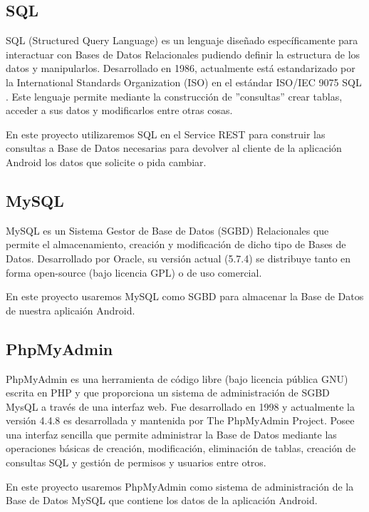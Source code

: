     \subsection{SQL}\label{ssec:sql}
    
	SQL \cite{ref:sql} (Structured Query Language) es un lenguaje diseñado específicamente para interactuar con Bases de Datos Relacionales pudiendo definir la estructura de los datos y manipularlos. Desarrollado en 1986, actualmente está estandarizado por la International Standards Organization (ISO) en el estándar ISO/IEC 9075 SQL \cite{ref:sql}. Este lenguaje permite mediante la construcción de ''consultas'' crear tablas, acceder a sus datos y modificarlos entre otras cosas.
	
	En este proyecto utilizaremos SQL en el Service REST para construir las consultas a Base de Datos necesarias para devolver al cliente de la aplicación Android los datos que solicite o pida cambiar.  
    
    \subsection{MySQL}\label{ssec:mysql}
    
	MySQL \cite{ref:mysql} es un Sistema Gestor de Base de Datos (SGBD) Relacionales que permite el almacenamiento, creación y modificación de dicho tipo de Bases de Datos. Desarrollado por Oracle, su versión actual (5.7.4) se distribuye tanto en forma open-source (bajo licencia GPL) o de uso comercial.     
	
	En este proyecto usaremos MySQL como SGBD para almacenar la Base de Datos de nuestra aplicaión Android.
    
    \subsection{PhpMyAdmin}\label{ssec:phpmyadmin}
    
	PhpMyAdmin \cite{ref:phpMyAdmin} es una herramienta de código libre (bajo licencia pública GNU) escrita en PHP y que proporciona un sistema de administración de SGBD MysQL a través de una interfaz web. Fue desarrollado en 1998 y actualmente la versión 4.4.8 es desarrollada y mantenida por The PhpMyAdmin Project. Posee una interfaz sencilla que permite administrar la Base de Datos mediante las operaciones básicas de creación, modificación, eliminación de tablas,  creación de consultas SQL y gestión de permisos y usuarios entre otros.
	
	En este proyecto usaremos PhpMyAdmin como sistema de administración de la Base de Datos MySQL que contiene los datos de la aplicación Android.
    
